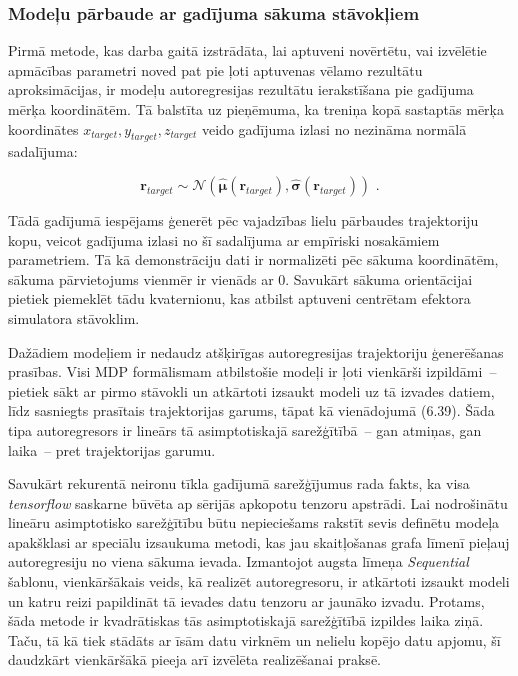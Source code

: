 \documentclass[12pt, a4paper]{article}
\numberwithin{equation}{section} %
\begin{document}
\subsubsection{Modeļu pārbaude ar gadījuma sākuma stāvokļiem}

Pirmā metode, kas darba gaitā izstrādāta, lai aptuveni novērtētu, vai izvēlētie apmācības parametri noved pat pie ļoti aptuvenas vēlamo rezultātu aproksimācijas, ir modeļu autoregresijas rezultātu ierakstīšana pie gadījuma mērķa koordinātēm. Tā balstīta uz pieņēmuma, ka treniņa kopā sastaptās mērķa koordinātes $x_{target}, y_{target}, z_{target}$ veido gadījuma izlasi no nezināma normālā sadalījuma:

\begin{equation}
    \mathbf{r}_{target} \sim \mathcal{N}(\hat{\boldsymbol{\mu}}(\mathbf{r}_{target}), \hat{\boldsymbol{\sigma}}(\mathbf{r}_{target}))
\text{ .}
\end{equation}

Tādā gadījumā iespējams ģenerēt pēc vajadzības lielu pārbaudes trajektoriju kopu, veicot gadījuma izlasi no šī sadalījuma ar empīriski nosakāmiem parametriem. Tā kā demonstrāciju dati ir normalizēti pēc sākuma koordinātēm, sākuma pārvietojums vienmēr ir vienāds ar 0. Savukārt sākuma orientācijai pietiek piemeklēt tādu kvaternionu, kas atbilst aptuveni centrētam efektora simulatora stāvoklim.

Dažādiem modeļiem ir nedaudz atšķirīgas autoregresijas trajektoriju ģenerēšanas prasības. Visi MDP formālismam atbilstošie modeļi ir ļoti vienkārši izpildāmi~-- pietiek sākt ar pirmo stāvokli un atkārtoti izsaukt modeli uz tā izvades datiem, līdz sasniegts prasītais trajektorijas garums, tāpat kā vienādojumā (6.39). Šāda tipa autoregresors ir lineārs tā asimptotiskajā sarežģītībā~-- gan atmiņas, gan laika~-- pret trajektorijas garumu. 

Savukārt rekurentā neironu tīkla gadījumā sarežģījumus rada fakts, ka visa \textit{tensorflow} saskarne būvēta ap sērijās apkopotu tenzoru apstrādi. Lai nodrošinātu lineāru asimptotisko sarežģītību būtu nepieciešams rakstīt sevis definētu modeļa apakšklasi ar speciālu izsaukuma metodi, kas jau skaitļošanas grafa līmenī pieļauj autoregresiju no viena sākuma ievada. Izmantojot augsta līmeņa \textit{Sequential} šablonu, vienkāršākais veids, kā realizēt autoregresoru, ir atkārtoti izsaukt modeli un katru reizi papildināt tā ievades datu tenzoru ar jaunāko izvadu. Protams, šāda metode ir kvadrātiskas tās asimptotiskajā sarežģītībā izpildes laika ziņā. Taču, tā kā tiek stādāts ar īsām datu virknēm un nelielu kopējo datu apjomu, šī daudzkārt vienkāršākā pieeja arī izvēlēta realizēšanai praksē.
\end{document}
